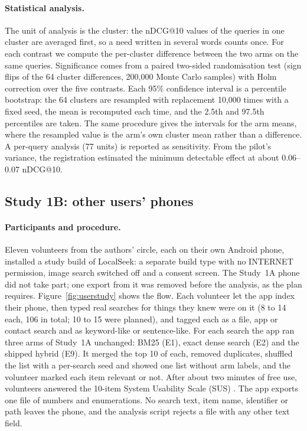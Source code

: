 \documentclass[pdflatex,sn-basic,Numbered]{sn-jnl}
\makeatletter
\newcommand{\ndcg}{nDCG@10}
\makeatother
\begin{document}
\paragraph{Statistical analysis.} The unit of analysis is the cluster: the \ndcg{} values of the queries in one cluster are averaged first, so a need written in several words counts once. For each contrast we compute the per-cluster difference between the two arms on the same queries. Significance comes from a paired two-sided randomisation test (sign flips of the 64 cluster differences, 200,000 Monte Carlo samples) with Holm correction over the five contrasts. Each 95\% confidence interval is a percentile bootstrap: the 64 clusters are resampled with replacement 10,000 times with a fixed seed, the mean is recomputed each time, and the 2.5th and 97.5th percentiles are taken. The same procedure gives the intervals for the arm means, where the resampled value is the arm's own cluster mean rather than a difference. A per-query analysis (77 units) is reported as sensitivity. From the pilot's variance, the registration estimated the minimum detectable effect at about 0.06--0.07 \ndcg{}.

\subsection{Study 1B: other users' phones}\label{sec:s1b}

\paragraph{Participants and procedure.} Eleven volunteers from the authors' circle, each on their own Android phone, installed a study build of LocalSeek: a separate build type with no INTERNET permission, image search switched off and a consent screen. The Study~1A phone did not take part; one export from it was removed before the analysis, as the plan requires. Figure~\ref{fig:userstudy} shows the flow. Each volunteer let the app index their phone, then typed real searches for things they knew were on it (8 to 14 each, 106 in total; 10 to 15 were planned), and tagged each as a file, app or contact search and as keyword-like or sentence-like. For each search the app ran three arms of Study~1A unchanged: BM25 (E1), exact dense search (E2) and the shipped hybrid (E9). It merged the top 10 of each, removed duplicates, shuffled the list with a per-search seed and showed one list without arm labels, and the volunteer marked each item relevant or not. After about two minutes of free use, volunteers answered the 10-item System Usability Scale (SUS) \citep{brooke1996sus}. The app exports one file of numbers and enumerations. No search text, item name, identifier or path leaves the phone, and the analysis script rejects a file with any other text field.
\end{document}
